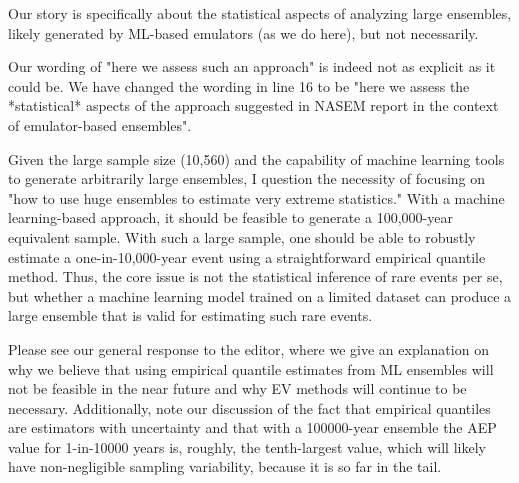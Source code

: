 \documentclass[12pt,english]{reviewresponse}
\begin{document}
\begin{revresponse}
Our story is specifically about the statistical aspects of analyzing large ensembles, likely generated by ML-based emulators (as we do here), but not necessarily.  

Our wording of "here we assess such an approach" is indeed not as explicit as it could be. We have changed the wording in line 16 to be "here we assess the *statistical* aspects of the approach suggested in NASEM report in the context of emulator-based ensembles". 
\end{revresponse}

\begin{revcomment}
    Given the large sample size (10,560) and the capability of machine learning tools to generate arbitrarily large ensembles, I question the necessity of focusing on "how to use huge ensembles to estimate very extreme statistics." With a machine learning-based approach, it should be feasible to generate a 100,000-year equivalent sample. With such a large sample, one should be able to robustly estimate a one-in-10,000-year event using a straightforward empirical quantile method. Thus, the core issue is not the statistical inference of rare events per se, but whether a machine learning model trained on a limited dataset can produce a large ensemble that is valid for estimating such rare events.

\end{revcomment}

\begin{revresponse}
    Please see our general response to the editor, where we give an explanation on why we believe that using empirical quantile estimates from ML ensembles will not be feasible in the near future and why EV methods will continue to be necessary.  Additionally, 
    note our discussion of the fact that empirical quantiles are estimators with uncertainty and that with a 100000-year ensemble the AEP value for 1-in-10000 years is, roughly, the tenth-largest value, which will likely have non-negligible sampling variability, because it is so far in the tail. 
\end{revresponse}
\end{document}
